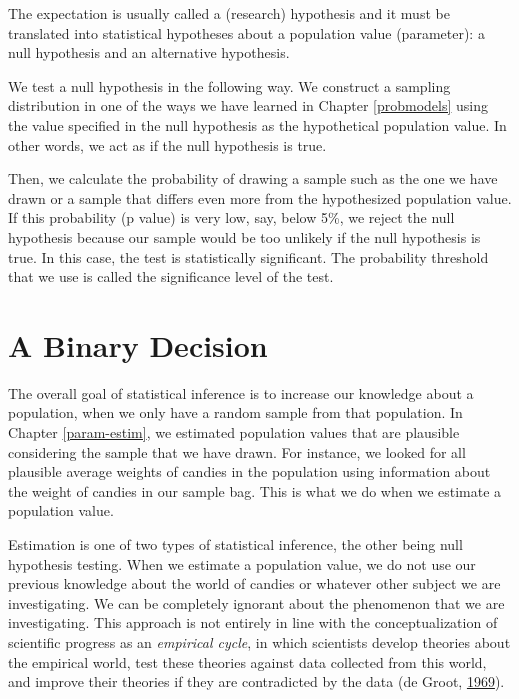 \documentclass[a4paper]{book}
\theoremstyle{definition}
\theoremstyle{definition}
\theoremstyle{definition}
\theoremstyle{remark}
\begin{document}
The expectation is usually called a (research) hypothesis and it must be
translated into statistical hypotheses about a population value
(parameter): a null hypothesis and an alternative hypothesis.

We test a null hypothesis in the following way. We construct a sampling
distribution in one of the ways we have learned in Chapter
\ref{probmodels} using the value specified in the null hypothesis as the
hypothetical population value. In other words, we act as if the null
hypothesis is true.

Then, we calculate the probability of drawing a sample such as the one
we have drawn or a sample that differs even more from the hypothesized
population value. If this probability (p value) is very low, say, below
5\%, we reject the null hypothesis because our sample would be too
unlikely if the null hypothesis is true. In this case, the test is
statistically significant. The probability threshold that we use is
called the significance level of the test.

\section{A Binary Decision}\label{binarydecision}

The overall goal of statistical inference is to increase our knowledge
about a population, when we only have a random sample from that
population. In Chapter \ref{param-estim}, we estimated population values
that are plausible considering the sample that we have drawn. For
instance, we looked for all plausible average weights of candies in the
population using information about the weight of candies in our sample
bag. This is what we do when we estimate a population value.

Estimation is one of two types of statistical inference, the other being
null hypothesis testing. When we estimate a population value, we do not
use our previous knowledge about the world of candies or whatever other
subject we are investigating. We can be completely ignorant about the
phenomenon that we are investigating. This approach is not entirely in
line with the conceptualization of scientific progress as an
\emph{empirical cycle}, in which scientists develop theories about the
empirical world, test these theories against data collected from this
world, and improve their theories if they are contradicted by the data
(de Groot,
\protect\hyperlink{ref-deGrootMethodologyFoundationsInference1969}{1969}).
\end{document}
